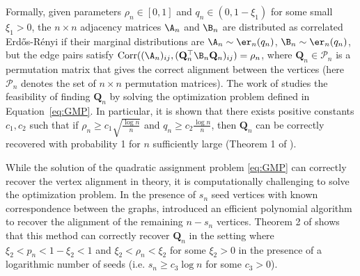 Formally, given parameters $\rho_n\in[0,1]$ and $q_n \in(0, 1-\xi_1)$ for some small $\xi_1>0$, the $n\times n$ adjacency matrices $\A_n$ and $\B_n$ are distributed as correlated Erd\H{o}s-R\'enyi if their marginal distributions are $\A_n\sim\er_n(q_n)$, $\B_n\sim\er_n(q_n)$, but the edge pairs satisfy $\text{Corr}((\A_n)_{ij},(\mathbf{Q}_n^\top\B_n\mathbf{Q}_n)_{ij})=\rho_n$, where $\mathbf{Q}_n\in\mathcal{P}_n$ is a permutation matrix that gives the correct alignment between the vertices (here $\mathcal{P}_n$ denotes the set of $n\times n$ permutation matrices). The work of \cite{Lyzinski2013-fq}  studies the feasibility of finding $\mathbf{Q}_n$ by solving the optimization problem defined in Equation~\eqref{eq:GMP}. In particular, it is shown that there exists positive constants $c_1, c_2$ such that if $\rho_n\geq c_1\sqrt{\frac{\log n}{n}}$ and $q_n\geq c_2 \frac{\log n }{n}$, then $\mathbf{Q}_n$ can be correctly recovered  with probability 1 for $n$ sufficiently large (Theorem 1 of \cite{Lyzinski2013-fq}). 

While the solution of the quadratic assignment problem \eqref{eq:GMP} can correctly recover the vertex alignment in theory, it is computationally challenging to solve the optimization problem. In the presence of $s_n$ seed vertices with known correspondence between the graphs, \cite{Lyzinski2013-fq} introduced an efficient polynomial algorithm to recover the alignment of the remaining $n-s_n$ vertices.
Theorem 2 of \cite{Lyzinski2013-fq} shows that this method can correctly recover $\mathbf{Q}_n$ in the setting where $\xi_2 < p_n<1-\xi_2<1$ and $\xi_2 < \rho_n < \xi_2$ for some $\xi_2>0$ in the presence of a logarithmic number of seeds (i.e. $s_n\geq c_3 \log n$ for some $c_3>0$).